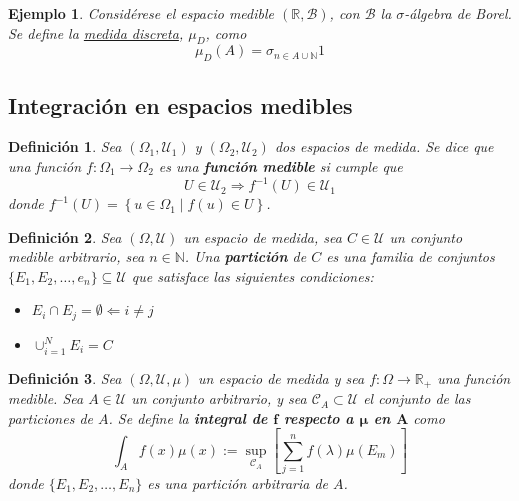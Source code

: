 \documentclass[12pt,letterpaper]{book}
\newtheorem{definicion}{Definición}[chapter]
\newtheorem{ejemplo}{Ejemplo}[chapter]
\newcommand{\R}{\mathbb{R}}
\newcommand{\N}{\mathbb{N}}
\newcommand{\talque}{\mathrel{}\middle|\mathrel{}}
\begin{document}
\begin{ejemplo}
Considérese el espacio medible $(\R, \mathcal{B})$, con $\mathcal{B}$ la $\sigma$-álgebra de Borel. Se define la \ul{medida discreta}, $\mu_D$, como
\begin{equation}
\mu_D(A) = \sigma_{n \in A \cup \N} 1
\end{equation}
\end{ejemplo}


\subsection{Integración en espacios medibles}

\begin{definicion}
Sea $(\Omega_1, \mathcal{U}_1)$ y $(\Omega_2, \mathcal{U}_2)$ dos espacios de medida. Se dice que una función $f:\Omega_1\rightarrow\Omega_2$ es una \textbf{función medible} si cumple que
\begin{equation}
U \in \mathcal{U}_2 \Rightarrow f^{-1}(U) \in \mathcal{U}_1 
\end{equation}
donde $f^{-1}(U) = \left\{ u\in \Omega_1 \talque f(u) \in U \right\}$.
\end{definicion}

\begin{definicion}
Sea $(\Omega, \mathcal{U})$ un espacio de medida, sea $C \in \mathcal{U}$ un conjunto medible arbitrario, sea $n\in \N$. Una \textbf{partición} de $C$ es una familia de conjuntos $\{E_1, E_2, \dots, e_n\} \subseteq\mathcal{U}$ que satisface las siguientes condiciones:
\begin{itemize}
\item $E_i \cap E_j = \emptyset \Leftarrow i\neq j $
\item $\cup_{i=1}^{N}  E_i = C $
\end{itemize}
\end{definicion}

\begin{definicion}
Sea $(\Omega, \mathcal{U}, \mu)$ un espacio de medida y sea $f:\Omega \rightarrow \R_+$ una función medible. Sea $A\in \mathcal{U}$ un conjunto arbitrario, y sea $\mathcal{C}_A \subset \mathcal{U}$ el conjunto de las particiones de $A$.
Se define la \textbf{integral de $\boldsymbol{f}$ respecto a $\boldsymbol{\mu}$ en $\boldsymbol{A}$} como
\begin{equation}
\int_A f(x) \mu(x) := \sup_{\mathcal{C}_A} \left[ \sum_{j=1}^{n} f(\lambda) \mu(E_m) \right]
\end{equation}
donde $\{ E_1, E_2, \dots, E_n \}$ es una partición arbitraria de $A$.
\end{definicion}
\end{document}
